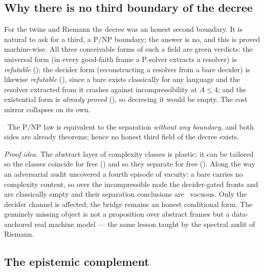 \subsection{Why there is no third boundary of the decree}

For the twins and Riemann the decree was an honest second boundary. It is natural to ask for a
third, a $\mathrm{P}/\mathrm{NP}$ boundary; the answer is no, and this is proved machine-wise. All
three conceivable forms of such a field are green verdicts: the universal form (in every good-faith
frame a P-solver extracts a resolver) is \emph{refutable} (); the
decider form (reconstructing a resolver from a bare decider) is likewise \emph{refutable}
(), since a bare  exists classically for any
language and the resolver extracted from it crashes against incompressibility at $A \le 4$; and the
existential form is \emph{already proved} (), so decreeing it would be
empty. The cost mirror collapses on its own.

\begin{proposition}\label{thm:pnpLaw_asserts_separation}
\green{}\ The $\mathrm{P}/\mathrm{NP}$ law is equivalent to the separation \emph{without any
boundary}, and both sides are already theorems; hence no honest third field of the decree exists.
\end{proposition}

\emph{Proof idea.} The abstract layer of complexity classes is plastic: it can be tailored so the
classes coincide for free () and so they separate for free ().
Along the way an adversarial audit uncovered a fourth episode of vacuity: a bare 
carries no complexity content, so over the incompressible node the decider-gated fronts
 and  are classically empty and their
separation conclusions are \warn{}~vacuous. Only the decider channel is affected; the 
bridge  remains an honest conditional form. The genuinely missing
object is not a proposition over abstract frames but a data-anchored real machine model --- the same
lesson taught by the spectral audit of Riemann.

\subsection{The epistemic complement}

